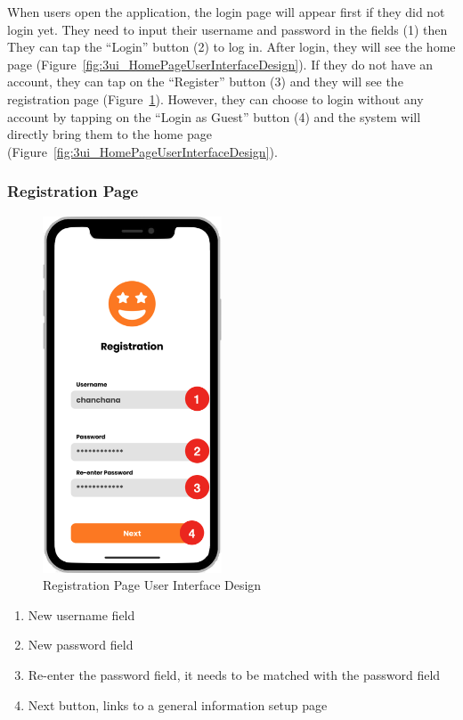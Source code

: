 \documentclass[12pt,oneside,openright,a4paper]{cpe-english-project}
\begin{document}
When users open the application, the login page will appear first if they did not login yet. They need to input their username and password in the fields (1) then They can tap the “Login” button (2) to log in. After login, they will see the home page (Figure~\ref{fig:3ui_HomePageUserInterfaceDesign}). If they do not have an account, they can tap on the “Register” button (3) and they will see the registration page (Figure~\ref{fig:3ui_RegistrationPageUserInterfaceDesign}). However, they can choose to login without any account by tapping on the “Login as Guest” button (4) and the system will directly bring them to the home page (Figure~\ref{fig:3ui_HomePageUserInterfaceDesign}).

\newpage
\subsubsection{Registration Page}
\begin{figure}[H]\centering
\includegraphics[height=300pt]{./images/3ui_RegistrationPageUserInterfaceDesign.png}
\caption{Registration Page User Interface Design}\label{fig:3ui_RegistrationPageUserInterfaceDesign}
\end{figure}

\begin{enumerate}
\item New username field
\item New password field
\item Re-enter the password field, it needs to be matched with the password field
\item Next button, links to a general information setup page
\end{enumerate}
\end{document}
